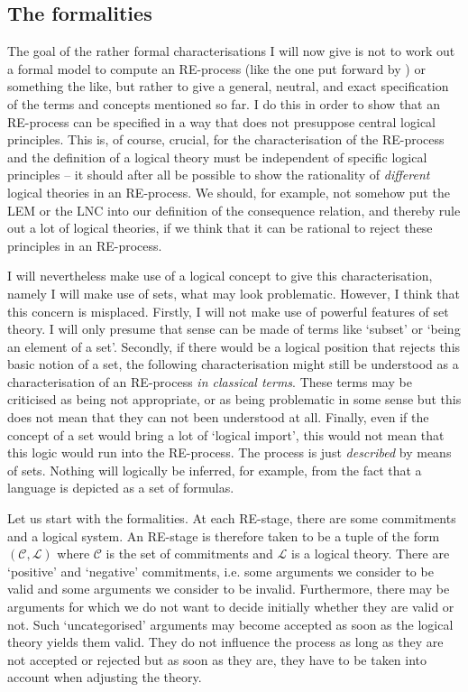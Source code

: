 \documentclass{article}
\begin{document}
\subsection{The formalities}
The goal of the rather formal characterisations I will now give is not to work out a formal model to compute an RE-process (like the one put forward by ) or something the like, but rather to give a general, neutral, and exact specification of the terms and concepts mentioned so far. I do this in order to show that an RE-process can be specified in a way that does not presuppose central logical principles. This is, of course, crucial, for the characterisation of the RE-process and the definition of a logical theory must be independent of specific logical principles -- it should after all be possible to show the rationality of \textit{different} logical theories in an RE-process. We should, for example, not somehow put the LEM or the LNC into our definition of the consequence relation, and thereby rule out a lot of logical theories, if we think that it can be rational to reject these principles in an RE-process.

I will nevertheless make use of a logical concept to give this characterisation, namely I will make use of sets, what may look problematic. However, I think that this concern is misplaced. Firstly, I will not make use of powerful features of set theory. I will only presume that sense can be made of terms like `subset' or `being an element of a set'. Secondly, if there would be a logical position that rejects this basic notion of a set, the following characterisation might still be understood as a characterisation of an RE-process \textit{in classical terms}. These terms may be criticised as being not appropriate, or as being problematic in some sense but this does not mean that they can not been understood at all. Finally, even if the concept of a set would bring a lot of `logical import', this would not mean that this logic would run into the RE-process. The process is just \textit{described} by means of sets. Nothing will logically be inferred, for example, from the fact that a language is depicted as a set of formulas. 

Let us start with the formalities. At each RE-stage, there are some commitments and a logical system. An RE-stage is therefore taken to be a tuple of the form $(\mathcal{C},\mathcal{L})$ where $\mathcal{C}$ is the set of commitments and $\mathcal{L}$ is a logical theory. There are `positive' and `negative' commitments, i.e. some arguments we consider to be valid and some arguments we consider to be invalid. Furthermore, there may be arguments for which we do not want to decide initially whether they are valid or not. Such `uncategorised' arguments may become accepted as soon as the logical theory yields them valid. They do not influence the process as long as they are not accepted or rejected but as soon as they are, they have to be taken into account when adjusting the theory.
\end{document}
